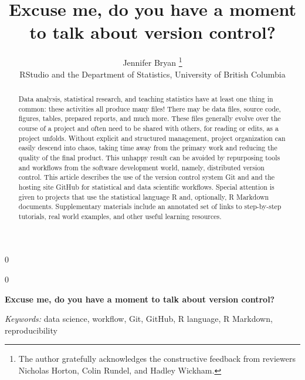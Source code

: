 \documentclass[12pt]{article}
\newcommand{\blind}{0}
\begin{document}
\def\spacingset#1{\renewcommand{\baselinestretch}%
{#1}\small\normalsize} \spacingset{1}



\blind
{
  \title{\bf Excuse me, do you have a moment to talk about version control?}

  \author{
        Jennifer Bryan \thanks{The author gratefully acknowledges the constructive feedback from
reviewers Nicholas Horton, Colin Rundel, and Hadley Wickham.} \\
    RStudio and the Department of Statistics, University of British Columbia\\
      }
  \maketitle
} \fi

\blind
{
  \bigskip
  \bigskip
  \bigskip
  \begin{center}
    {\LARGE\bf Excuse me, do you have a moment to talk about version control?}
  \end{center}
  \medskip
} \fi

\bigskip
\begin{abstract}
Data analysis, statistical research, and teaching statistics have at
least one thing in common: these activities all produce many files!
There may be data files, source code, figures, tables, prepared reports,
and much more. These files generally evolve over the course of a project
and often need to be shared with others, for reading or edits, as a
project unfolds. Without explicit and structured management, project
organization can easily descend into chaos, taking time away from the
primary work and reducing the quality of the final product. This unhappy
result can be avoided by repurposing tools and workflows from the
software development world, namely, distributed version control. This
article describes the use of the version control system Git and and the
hosting site GitHub for statistical and data scientific workflows.
Special attention is given to projects that use the statistical language
R and, optionally, R Markdown documents. Supplementary materials include
an annotated set of links to step-by-step tutorials, real world
examples, and other useful learning resources.
\end{abstract}

\noindent%
{\it Keywords:} data science, workflow, Git, GitHub, R language, R Markdown,
reproducibility
\vfill
\end{document}
